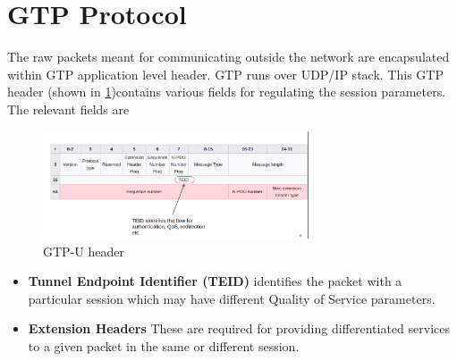 \section {GTP Protocol\label{sec:GTP}}
The raw packets meant for communicating outside the network are encapsulated within GTP  application level 
header. GTP runs over UDP/IP stack. This GTP header  (shown in \ref{figGTPheader})contains various fields for regulating the
 session parameters. The relevant fields are
 \begin{figure}[htbp]
    \centering
    \includegraphics[width=0.7\textwidth, keepaspectratio]{./fig/gtp.png}
    \caption{GTP-U header \cite{gtpwiki}}
    \label{figGTPheader}
\end{figure}
 \begin{itemize}
    \item \textbf{Tunnel Endpoint Identifier (TEID)} identifies the packet with a particular session which may have different Quality of Service parameters.
    \item \textbf{Extension Headers} These are required for providing differentiated services to  a given packet in the same or different session.
 \end{itemize}

